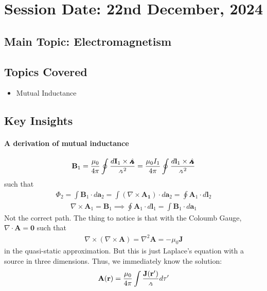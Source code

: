 \section{Session Date: 22nd December, 2024}
\subsection*{Main Topic: Electromagnetism}
\subsection*{Topics Covered}
\begin{itemize}
    \item Mutual Inductance
\end{itemize}

\subsection*{Key Insights}
\paragraph{A derivation of mutual inductance} \begin{align*}
    \mathbf{B}_1 = \frac{\mu_0}{ 4 \pi } \oint \frac{d \mathbf{I}_1 \times \hatgriffr}{\griffr[2]^2} = \frac{\mu_0 I_1}{4 \pi } \oint \frac{d \mathbf{l}_1 \times \hatgriffr }{\griffr[2] ^{2} }
\end{align*}
such that \begin{align*}
    \Phi _2 = \int \mathbf{B}_1 \cdot d \mathbf{a}_2 = \int \left( \nabla \times \mathbf{A_1} \right) \cdot d \mathbf{a}_2 = \oint \mathbf{A}_1 \cdot d \mathbf{l}_2
\end{align*}
\begin{align*}
    \nabla \times \mathbf{A}_1 = \mathbf{B}_1 \implies \oint \mathbf{A}_1 \cdot d \mathbf{l}_1 = \int \mathbf{B}_1 \cdot d \mathbf{a}_1
\end{align*}
Not the correct path. The thing to notice is that with the Coloumb Gauge, \(\nabla \cdot \mathbf{A} = \mathbf{0}\) such that \begin{align*}
    \nabla \times \left( \nabla \times \mathbf{A} \right) = \nabla ^{2} \mathbf{A} = - \mu _0 \mathbf{J}
\end{align*} 
in the quasi-static approximation. But this is just Laplace's equation with a source in three dimensions. Thus, we immediately know the solution: \begin{align*}
    \mathbf{A}(\mathbf{r}) = \frac{\mu _0}{4 \pi } \int \frac{\mathbf{J}(\mathbf{r}^{\prime})}{\griffr[2] } d \tau ^{\prime} 
\end{align*}

